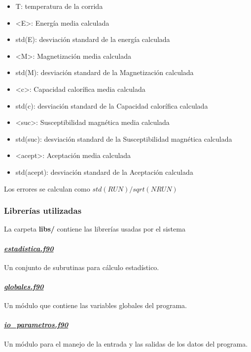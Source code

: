 \begin{itemize}
  \item T: temperatura de la corrida 
    \item <E>: Energ\'ia media calculada
    \item  std(E): desviaci\'on standard de la energ\'ia calculada

    \item <M>: Magnetizaci\'on media calculada
    \item  std(M): desviaci\'on standard de la Magnetizaci\'on calculada


    \item <c>: Capacidad calor\'ifica media calculada
    \item  std(c): desviaci\'on standard de la Capacidad calor\'ifica calculada

    \item <suc>: Susceptibilidad magn\'etica media calculada
    \item  std(suc): desviaci\'on standard de la Susceptibilidad magn\'etica calculada


    \item <acept>: Aceptaci\'on media calculada
    \item  std(acept): desviaci\'on standard de la Aceptaci\'on calculada
\end{itemize}



  Los errores se calculan como $std(RUN)/sqrt(NRUN)$


\subsubsection{Librer\'ias utilizadas}

La carpeta \textbf{libs/} contiene las librer\'ias usadas por el sistema

\paragraph{\underline{\textit{estadistica.f90}}}

Un conjunto de subrutinas para c\'alculo estad\'istico. 

\paragraph{\underline{\textit{globales.f90}}}
Un m\'odulo que contiene las variables globales del programa.
	
\paragraph{\underline{\textit{io\_parametros.f90}}}  
Un m\'odulo para el manejo de la entrada y las salidas de los
datos del programa.


